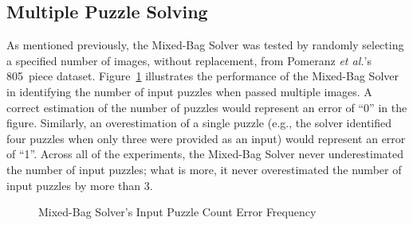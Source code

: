 \subsection{Multiple Puzzle Solving}

As mentioned previously, the Mixed-Bag Solver was tested by randomly selecting a specified number of images, without replacement, from Pomeranz \textit{et al.}'s  805~piece dataset.  Figure~\ref{fig:inputPuzzleCountErrorFrequency} illustrates the performance of the Mixed-Bag Solver in identifying the number of input puzzles when passed multiple images.  A correct estimation of the number of puzzles would represent an error of ``0'' in the figure.  Similarly, an overestimation of a single puzzle (e.g., the solver identified four puzzles when only three were provided as an input) would represent an error of ``1''.  Across all of the experiments, the Mixed-Bag Solver never underestimated the number of input puzzles; what is more, it never overestimated the number of input puzzles by more than 3.  

\begin{figure}
\begin{center}
\end{center}
\caption{Mixed-Bag Solver's Input Puzzle Count Error Frequency}
\label{fig:inputPuzzleCountErrorFrequency}
\end{figure}

